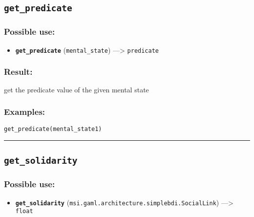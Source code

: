 \documentclass[]{book}
\providecommand{\tightlist}{%
  \setlength{\itemsep}{0pt}\setlength{\parskip}{0pt}}
\theoremstyle{definition}
\theoremstyle{definition}
\theoremstyle{definition}
\theoremstyle{remark}
\begin{document}
\subsection{\texorpdfstring{\texttt{get\_predicate}}{get\_predicate}}\label{get_predicate}

\subsubsection{Possible use:}\label{possible-use-226}

\begin{itemize}
\tightlist
\item
  \textbf{\texttt{get\_predicate}} (\texttt{mental\_state})
  ---\textgreater{} \texttt{predicate}
\end{itemize}

\subsubsection{Result:}\label{result-220}

get the predicate value of the given mental state

\subsubsection{Examples:}\label{examples-173}

\begin{verbatim}
get_predicate(mental_state1) 
\end{verbatim}

\begin{center}\rule{0.5\linewidth}{\linethickness}\end{center}

\subsection{\texorpdfstring{\texttt{get\_solidarity}}{get\_solidarity}}\label{get_solidarity}

\subsubsection{Possible use:}\label{possible-use-227}

\begin{itemize}
\tightlist
\item
  \textbf{\texttt{get\_solidarity}}
  (\texttt{msi.gaml.architecture.simplebdi.SocialLink})
  ---\textgreater{} \texttt{float}
\end{itemize}
\end{document}
